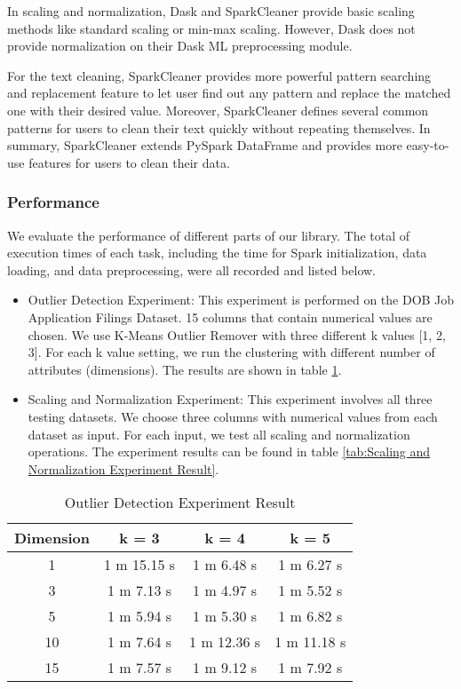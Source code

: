 \documentclass[sigconf]{acmart}
\begin{document}
In scaling and normalization, Dask and SparkCleaner provide basic scaling methods like standard scaling or min-max scaling. However, Dask does not provide normalization on their Dask ML preprocessing module.

For the text cleaning, SparkCleaner provides more powerful pattern searching and replacement feature to let user find out any pattern and replace the matched one with their desired value. Moreover, SparkCleaner defines several common patterns for users to clean their text quickly without repeating themselves. In summary, SparkCleaner extends PySpark DataFrame and provides more easy-to-use features for users to clean their data.

\subsubsection{Performance} We evaluate the performance of different parts of our library. The total of execution times of each task, including the time for Spark initialization, data loading, and data preprocessing, were all recorded and listed below.
\begin{itemize}
	\item{Outlier Detection Experiment}: This experiment is performed on the DOB Job Application Filings Dataset. 15 columns that contain numerical values are chosen. We use K-Means Outlier Remover with three different k values [1, 2, 3]. For each k value setting, we run the clustering with different number of attributes (dimensions). The results are shown in table \ref{tab:Outlier Detection Experiment Result}.
	\item{Scaling and Normalization Experiment}: This experiment involves all three testing datasets. We choose three columns with numerical values from each dataset as input. For each input, we test all scaling and normalization operations. The experiment results can be found in table \ref{tab:Scaling and Normalization Experiment Result}.
\end{itemize}

\begin{table}
\caption{Outlier Detection Experiment Result}   
\label{tab:Outlier Detection Experiment Result}
\begin{tabular}{cccc}   
Dimension  &  k = 3  &  k = 4  & k = 5  \\  
\hline
1   & 1 m 15.15 s  & 1 m 6.48 s   & 1 m 6.27 s             \\ 
3   & 1 m 7.13 s    & 1 m 4.97 s   & 1 m 5.52 s             \\  
5   & 1 m 5.94 s    & 1 m 5.30 s   & 1 m 6.82 s             \\ 
10 & 1 m 7.64 s    & 1 m 12.36 s & 1 m 11.18 s           \\ 
15 & 1 m 7.57 s    & 1 m 9.12 s   & 1 m 7.92 s             \\ 

\end{tabular}   
\end{table}
\end{document}
